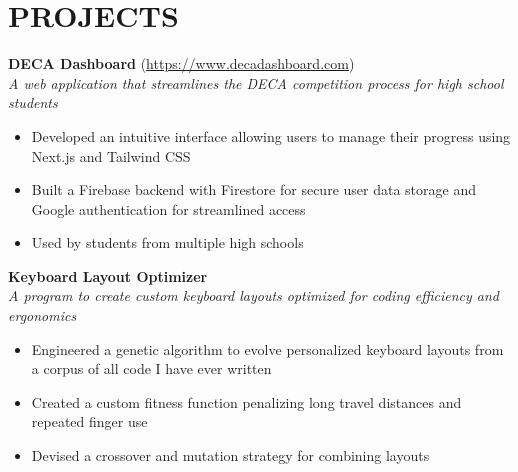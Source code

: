 \section*{PROJECTS}


\noindent
\textbf{DECA Dashboard} (\href{https://www.decadashboard.com}{https://www.decadashboard.com}) \\
\textit{A web application that streamlines the DECA competition process for high school students}
\begin{itemize}
	\item Developed an intuitive interface allowing users to manage their progress using Next.js and Tailwind CSS
	\item Built a Firebase backend with Firestore for secure user data storage and Google authentication for streamlined access
	\item Used by students from multiple high schools
\end{itemize}


\noindent
\textbf{Keyboard Layout Optimizer} \\
\textit{A program to create custom keyboard layouts optimized for coding efficiency and ergonomics}
\begin{itemize}
	\item Engineered a genetic algorithm to evolve personalized keyboard layouts from a corpus of all code I have ever written
	\item Created a custom fitness function penalizing long travel distances and repeated finger use
	\item Devised a crossover and mutation strategy for combining layouts
\end{itemize}

